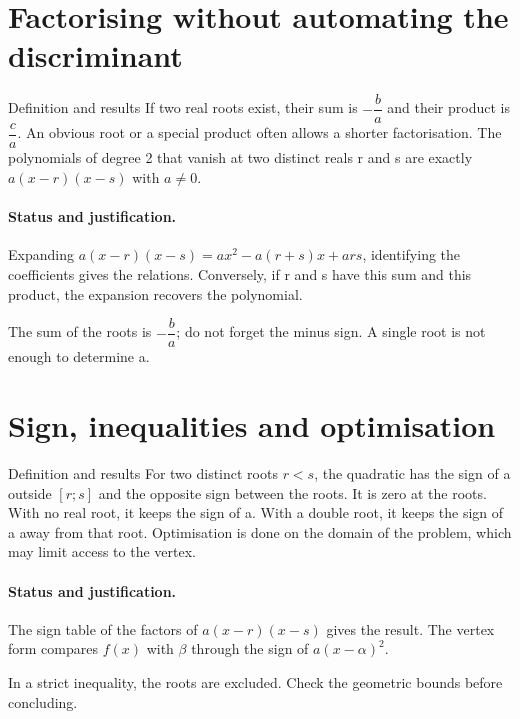 \section{Factorising without automating the discriminant}\label{C02-U3}
\begin{repere}{Definition and results}
If two real roots exist, their sum is $-\dfrac{b}{a}$ and their product is $\dfrac{c}{a}$. An obvious root or a special product often allows a shorter factorisation. The polynomials of degree 2 that vanish at two distinct reals r and s are exactly $a(x-r)(x-s)$ with $a\ne0$.
\end{repere}
\paragraph{Status and justification.} Expanding $a(x-r)(x-s)=ax^2-a(r+s)x+ars$, identifying the coefficients gives the relations. Conversely, if r and s have this sum and this product, the expansion recovers the polynomial.
\label{C02-EX3}
\begin{erreur}The sum of the roots is $-\dfrac{b}{a}$; do not forget the minus sign. A single root is not enough to determine a.\end{erreur}
\label{C02-AP3}
\section{Sign, inequalities and optimisation}\label{C02-U4}
\begin{repere}{Definition and results}
For two distinct roots $r<s$, the quadratic has the sign of a outside $[r;s]$ and the opposite sign between the roots. It is zero at the roots. With no real root, it keeps the sign of a. With a double root, it keeps the sign of a away from that root. Optimisation is done on the domain of the problem, which may limit access to the vertex.
\end{repere}
\paragraph{Status and justification.} The sign table of the factors of $a(x-r)(x-s)$ gives the result. The vertex form compares $f(x)$ with $\beta$ through the sign of $a(x-\alpha)^2$.
\label{C02-EX4}
\begin{erreur}In a strict inequality, the roots are excluded. Check the geometric bounds before concluding.\end{erreur}
\label{C02-AP4}
